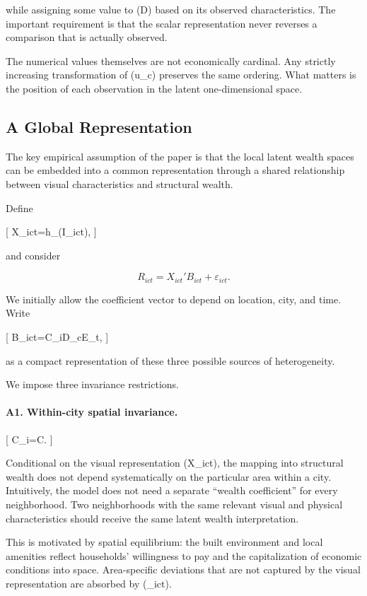 while assigning some value to (D) based on its observed characteristics. The important requirement is that the scalar representation never reverses a comparison that is actually observed.

The numerical values themselves are not economically cardinal. Any strictly increasing transformation of (u_c) preserves the same ordering. What matters is the position of each observation in the latent one-dimensional space.

\subsection{A Global Representation}

The key empirical assumption of the paper is that the local latent wealth spaces can be embedded into a common representation through a shared relationship between visual characteristics and structural wealth.

Define

[
X_{ict}=h_{\theta}(I_{ict}),
]

and consider

\begin{equation}
R_{ict}=X_{ict}'B_{ict}+\varepsilon_{ict}.
\label{eq:global_model_general}
\end{equation}

We initially allow the coefficient vector to depend on location, city, and time. Write

[
B_{ict}=C_iD_cE_t,
]

as a compact representation of these three possible sources of heterogeneity.

We impose three invariance restrictions.

\paragraph{A1. Within-city spatial invariance.}

[
C_i=C.
]

Conditional on the visual representation (X_{ict}), the mapping into structural wealth does not depend systematically on the particular area within a city. Intuitively, the model does not need a separate ``wealth coefficient'' for every neighborhood. Two neighborhoods with the same relevant visual and physical characteristics should receive the same latent wealth interpretation.

This is motivated by spatial equilibrium: the built environment and local amenities reflect households' willingness to pay and the capitalization of economic conditions into space. Area-specific deviations that are not captured by the visual representation are absorbed by (\varepsilon_{ict}).

